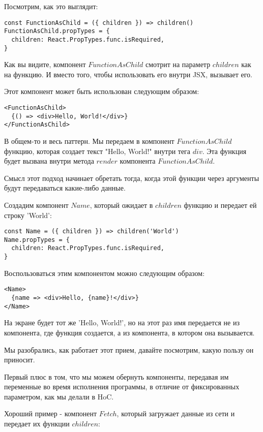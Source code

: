 Посмотрим, как это выглядит:

\begin{lstlisting}
const FunctionAsChild = ({ children }) => children()
FunctionAsChild.propTypes = {
  children: React.PropTypes.func.isRequired,
}
\end{lstlisting}

Как вы видите, компонент $FunctionAsChild$ смотрит на параметр $children$ как на функцию. И вместо того, чтобы использовать его внутри JSX, вызывает его.

Этот компонент может быть использован следующим образом:

\begin{lstlisting}
<FunctionAsChild>
  {() => <div>Hello, World!</div>}
</FunctionAsChild>
\end{lstlisting}

В общем-то и весь паттерн. Мы передаем в компонент $FunctionAsChild$ функцию, которая создает текст "Hello, World!" внутри тега $div$. Эта функция будет вызвана внутри метода $render$ компонента $FunctionAsChild$.

Смысл этот подход начинает обретать тогда, когда этой функции через аргументы будут передаваться какие-либо данные.

Создадим компонент $Name$, который ожидает в $children$ функцию и передает ей строку 'World':

\begin{lstlisting}
const Name = ({ children }) => children('World')
Name.propTypes = {
  children: React.PropTypes.func.isRequired,
}
\end{lstlisting}

Воспользоваться этим компонентом можно следующим образом:

\begin{lstlisting}
<Name>
  {name => <div>Hello, {name}!</div>}
</Name>
\end{lstlisting}

На экране будет тот же 'Hello, World!', но на этот раз имя передается не из компонента, где функция создается, а из компонента, в котором она вызывается.

Мы разобрались, как работает этот прием, давайте посмотрим, какую пользу он приносит.

Первый плюс в том, что мы можем обернуть компоненты, передавая им переменные во время исполнения программы, в отличие от фиксированных параметром, как мы делали в HoC.

Хороший пример - компонент $Fetch$, который загружает данные из сети и передает их функции $children$:

